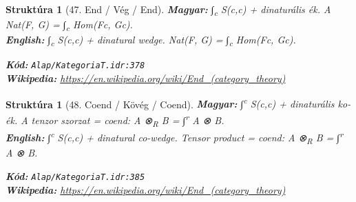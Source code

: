 \documentclass[11pt,a4paper,twocolumn]{article}
\newtheorem{struktura}[tetel]{Struktúra}
\begin{document}
\begin{struktura}[47. End / Vég / End]

\textbf{Magyar:} ∫\textsubscript{c} S(c,c) + dinaturális ék. A Nat(F, G) = ∫\textsubscript{c} Hom(Fc, Gc).\\

\textbf{English:} ∫\textsubscript{c} S(c,c) + dinatural wedge. Nat(F, G) = ∫\textsubscript{c} Hom(Fc, Gc).\\

\begin{center}
\end{center}

\textbf{Kód:} \texttt{Alap/KategoriaT.idr:378}\\
\textbf{Wikipedia:} \url{https://en.wikipedia.org/wiki/End_(category_theory)}

\end{struktura}

\vspace{0.5cm}

\begin{struktura}[48. Coend / Kövég / Coend]

\textbf{Magyar:} ∫\textsuperscript{c} S(c,c) + dinaturális ko-ék. A tenzor szorzat = coend: A ⊗\textsubscript{R} B = ∫\textsuperscript{r} A ⊗ B.\\

\textbf{English:} ∫\textsuperscript{c} S(c,c) + dinatural co-wedge. Tensor product = coend: A ⊗\textsubscript{R} B = ∫\textsuperscript{r} A ⊗ B.\\

\begin{center}
\end{center}

\textbf{Kód:} \texttt{Alap/KategoriaT.idr:385}\\
\textbf{Wikipedia:} \url{https://en.wikipedia.org/wiki/End_(category_theory)}

\end{struktura}

\vspace{0.5cm}
\end{document}
